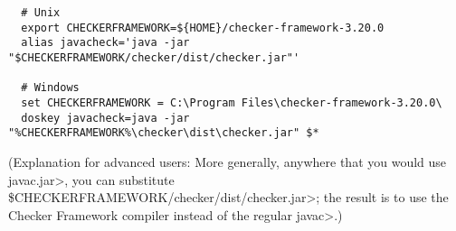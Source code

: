 \begin{itemize}
\begin{Verbatim}
  # Unix
  export CHECKERFRAMEWORK=${HOME}/checker-framework-3.20.0
  alias javacheck='java -jar "$CHECKERFRAMEWORK/checker/dist/checker.jar"'

  # Windows
  set CHECKERFRAMEWORK = C:\Program Files\checker-framework-3.20.0\
  doskey javacheck=java -jar "%CHECKERFRAMEWORK%\checker\dist\checker.jar" $*
\end{Verbatim}

  (Explanation for advanced users:
  More generally, anywhere that you would use \<javac.jar>, you can substitute
  \<\$CHECKERFRAMEWORK/checker/dist/checker.jar>;
  the result is to use the Checker
  Framework compiler instead of the regular \<javac>.)

\end{itemize}



%
%
%
%
%
%
%
%
%


